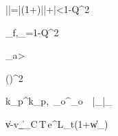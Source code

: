 \left|\right|=\left|(1+\delta)\right|\left|+\right|\le\mu<1-Q^2

\tau_f\ge{},\quad \mu_{\max}=1-Q^2

\tau_a>

\le\left(\frac{\omega_{\max}}{\omega_{\min}}\right)^2

k_p^{}\ge k_p,\ \omega_o^{}\ge\omega_o\ \Rightarrow\ \bar{\sigma}_{}\le\bar{\sigma}_{}

\left\|v-v_{}\right\|_{\infty}\le C\,\Delta T\,e^{L\delta_t}\left(1+\left\|w\right\|_{\infty}\right)
